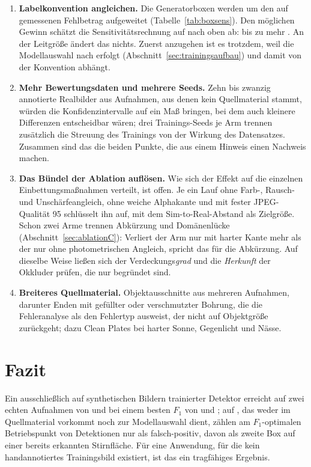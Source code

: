 \begin{enumerate}[itemsep=3pt,leftmargin=1.6em]
  \item \textbf{Labelkonvention angleichen.} Die Generatorboxen werden um den
  auf  gemessenen Fehlbetrag aufgeweitet (Tabelle~\ref{tab:boxsens}).
  Den möglichen Gewinn schätzt die Sensitivitätsrechnung auf  nach
  oben ab: bis zu \zsensTestGain\PP{} mehr \mAPseven. An der
  Leitgröße
  \mAPfifty{} ändert das nichts. Zuerst anzugehen ist es trotzdem, weil die
  Modellauswahl nach \mAPall{} erfolgt (Abschnitt~\ref{sec:trainingsaufbau})
  und damit von der Konvention abhängt.
  \item \textbf{Mehr Bewertungsdaten und mehrere Seeds.} Zehn bis zwanzig
  annotierte Realbilder aus Aufnahmen, aus denen kein Quellmaterial stammt,
  würden die Konfidenzintervalle auf ein Maß bringen, bei
  dem auch kleinere Differenzen entscheidbar wären; drei Trainings-Seeds je Arm
  trennen zusätzlich die Streuung des Trainings von der Wirkung des Datensatzes.
  Zusammen sind das die beiden Punkte, die aus einem Hinweis einen Nachweis
  machen.
  \item \textbf{Das Bündel der Ablation auflösen.} Wie sich der Effekt auf die
  einzelnen Einbettungsmaßnahmen verteilt, ist offen. Je ein Lauf ohne Farb-,
  Rausch- und Unschärfeangleich, ohne weiche Alphakante und mit fester
  JPEG-Qualität 95 schlüsselt ihn auf, mit dem Sim-to-Real-Abstand als Zielgröße. Schon zwei Arme
  trennen Abkürzung und Domänenlücke (Abschnitt~\ref{sec:ablationC}): Verliert
  der Arm nur mit harter Kante mehr als der nur ohne photometrischen Angleich,
  spricht das für die Abkürzung. Auf dieselbe Weise ließen sich der
  Verdeckungs\emph{grad} und die \emph{Herkunft} der Okkluder prüfen, die
  nur begründet sind.
  \item \textbf{Breiteres Quellmaterial.} Objektausschnitte aus mehreren
  Aufnahmen, darunter Enden mit gefüllter oder verschmutzter Bohrung, die die
  Fehleranalyse als den Fehlertyp ausweist, der nicht auf Objektgröße
  zurückgeht; dazu Clean Plates bei harter Sonne, Gegenlicht und Nässe.
\end{enumerate}

\section{Fazit}
\label{sec:fazit}

Ein ausschließlich auf synthetischen Bildern trainierter Detektor erreicht auf
zwei echten Aufnahmen \mAPfifty{} von \textbf{\zrefValMap} und
\textbf{\zrefTestMap} bei einem besten $F_1$ von \zrefValFf{} und \zrefTestFf;
auf , das weder im Quellmaterial vorkommt noch zur Modellauswahl
dient, zählen am $F_1$-optimalen Betriebspunkt von \znPredTest{} Detektionen
nur \zfpTest{} als falsch-positiv,
\zfpDoppelTest{} davon als zweite Box auf einer bereits erkannten Stirnfläche. Für
eine Anwendung, für die kein handannotiertes Trainingsbild existiert,
ist das ein tragfähiges Ergebnis.

